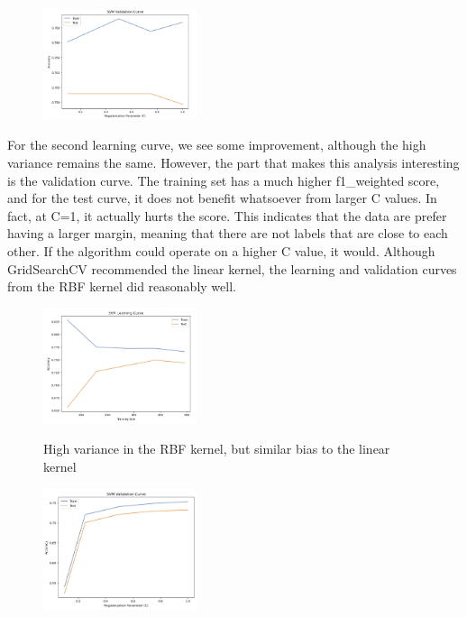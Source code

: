 \documentclass[conference]{IEEEtran}
\begin{document}
\begin{figure}[H]
    \centering
    \includegraphics[width=0.40\textwidth]{PIMA Indian Diabetes Graphs/SVC/svc vc.png}
    \label{fig:enter-label}
\end{figure}

For the second learning curve, we see some improvement, although the high variance remains the same. However, the part that makes this analysis interesting is the validation curve. The training set has a much higher f1\_weighted score, and for the test curve, it does not benefit whatsoever from larger C values. In fact, at C=1, it actually hurts the score. This indicates that the data are prefer having a larger margin, meaning that there are not labels that are close to each other. If the algorithm could operate on a higher C value, it would. Although GridSearchCV recommended the linear kernel, the learning and validation curves from the RBF kernel did reasonably well. 

\begin{figure}[H]
    \centering
    \includegraphics[width=0.40\textwidth]{PIMA Indian Diabetes Graphs/SVC/svc rbf lc.png}
    \label{fig:enter-label}
    \caption{High variance in the RBF kernel, but similar bias to the linear kernel}
\end{figure}

\begin{figure}[H]
    \centering
    \includegraphics[width=0.40\textwidth]{PIMA Indian Diabetes Graphs/SVC/svc rbf vc.png}
    \label{fig:enter-label}
\end{figure}
\end{document}

